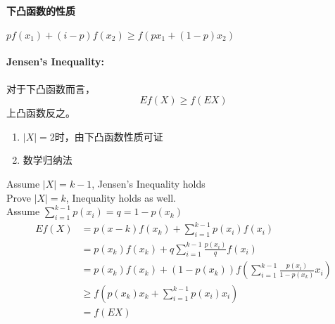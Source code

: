 \documentclass[a4paper, 12pt]{article}
\begin{document}
    \paragraph{下凸函数的性质} $pf(x_1)+(i-p)f(x_2)\ge f(px_1+(1-p)x_2)$
    \paragraph{Jensen's Inequality:} 对于下凸函数而言，
    \[Ef(X)\ge f(EX)\]
    上凸函数反之。
    \begin{enumerate}
        \item $|X|=2$时，由下凸函数性质可证
        \item 数学归纳法
    \end{enumerate}
    Assume $|X|=k-1$, Jensen's Inequality holds\\
    Prove $|X|=k$, Inequality holds as well.\\
    Assume $\sum_{i=1}^{k-1}p(x_i)=q=1-p(x_k)$
    \begin{align}
        Ef(X)&=p(x-k)f(x_k)+\sum_{i=1}^{k-1}p(x_i)f(x_i)\\
        &=p(x_k)f(x_k)+q\sum_{i=1}^{k-1}\frac{p(x_i)}{q}f(x_i)\\
        &=p(x_k)f(x_k)+(1-p(x_k))f(\sum_{i=1}^{k-1}\frac{p(x_i)}{1-p(x_k)}x_i)\\
        &\ge f(p(x_k)x_k+\sum_{i=1}^{k-1}p(x_i)x_i)\\
        &=f(EX)
    \end{align}
\end{document}
